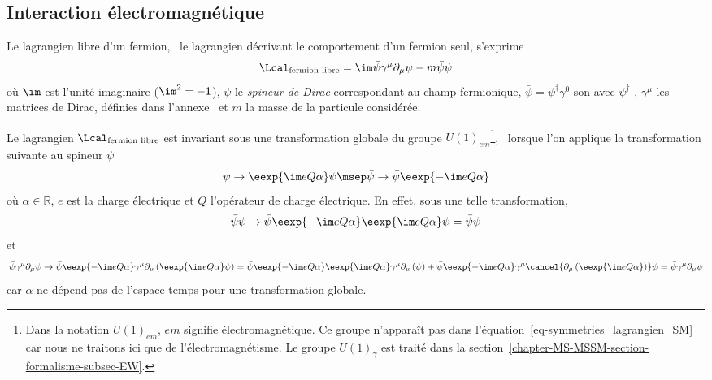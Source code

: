 \subsection{Interaction électromagnétique}\label{chapter-MS-MSSM-section-formalisme-subsec-QED}
Le lagrangien libre d'un fermion, \ie\ le lagrangien décrivant le comportement d'un fermion seul, s'exprime
\begin{equation}
\Lcal_{\text{fermion libre}} = \im \bar{\psi} \gamma^\mu\partial_\mu \psi - m \bar{\psi}\psi
\label{eq-lagrangien_fermion_libre_partial}
\end{equation}
où $\im$ est l'unité imaginaire ($\im^2=-1$), $\psi$ le \emph{spineur de Dirac} correspondant au champ fermionique, $\bar{\psi}=\psi^\dagger\gamma^0$ son  avec $\psi^\dagger$ , $\gamma^\mu$ les matrices de Dirac, définies dans l'annexe~ et $m$ la masse de la particule considérée.
\par Le lagrangien $\Lcal_{\text{fermion libre}}$ est invariant sous une transformation globale du groupe $U(1)_{em}$\footnote{Dans la notation $U(1)_{em}$, \og $em$ \fg{} signifie électromagnétique. Ce groupe n'apparaît pas dans l'équation~\eqref{eq-symmetries_lagrangien_SM} car nous ne traitons ici que de l'électromagnétisme. Le groupe $U(1)_\gamma$ est traité dans la section~\ref{chapter-MS-MSSM-section-formalisme-subsec-EW}.}, \ie\ lorsque l'on applique la transformation suivante au spineur $\psi$
\begin{equation}
\psi \to \eexp{\im eQ\alpha}\psi
\msep
\bar{\psi} \to \bar{\psi}\eexp{-\im eQ\alpha}
\end{equation}
où $\alpha\in\mathbb{R}$, $e$ est la charge électrique et $Q$ l'opérateur de charge électrique.
En effet, sous une telle transformation,
\begin{equation}
\bar{\psi}\psi \to \bar{\psi}\eexp{-\im eQ\alpha}\eexp{\im eQ\alpha}\psi = \bar{\psi}\psi
\end{equation}
et
\begin{equation}
\bar{\psi} \gamma^\mu\partial_\mu \psi
\to
\bar{\psi}\eexp{-\im eQ\alpha}
\gamma^\mu\partial_\mu
\left(\eexp{\im eQ\alpha}\psi\right)
=
\bar{\psi}\eexp{-\im eQ\alpha}
\eexp{\im eQ\alpha}
\gamma^\mu\partial_\mu
\left(\psi\vphantom{\psi\eexp{\im eQ\alpha}}\right)
+
\bar{\psi}\eexp{-\im eQ\alpha}
\gamma^\mu
\cancel{\partial_\mu \left(\eexp{\im eQ\alpha}\vphantom{\psi\eexp{\im eQ\alpha}}\right)}\psi
= \bar{\psi} \gamma^\mu\partial_\mu \psi
\end{equation}
car $\alpha$ ne dépend pas de l'espace-temps pour une transformation globale.
